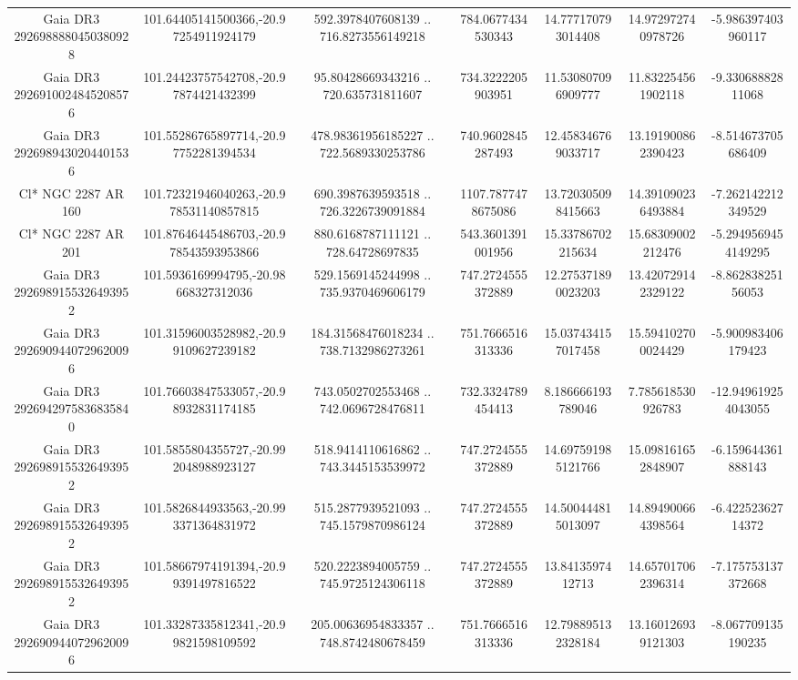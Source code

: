 \begin{table}
\begin{tabular}{ccccccc}
Gaia DR3 2926988880450380928 & 101.64405141500366,-20.97254911924179 & 592.3978407608139 .. 716.8273556149218 & 784.0677434530343 & 14.777170793014408 & 14.972972740978726 & -5.986397403960117 \\
Gaia DR3 2926910024845208576 & 101.24423757542708,-20.97874421432399 & 95.80428669343216 .. 720.635731811607 & 734.3222205903951 & 11.530807096909777 & 11.832254561902118 & -9.33068882811068 \\
Gaia DR3 2926989430204401536 & 101.55286765897714,-20.97752281394534 & 478.98361956185227 .. 722.5689330253786 & 740.9602845287493 & 12.458346769033717 & 13.191900862390423 & -8.514673705686409 \\
Cl* NGC 2287     AR     160 & 101.72321946040263,-20.978531140857815 & 690.3987639593518 .. 726.3226739091884 & 1107.7877478675086 & 13.720305098415663 & 14.391090236493884 & -7.262142212349529 \\
Cl* NGC 2287     AR     201 & 101.87646445486703,-20.978543593953866 & 880.6168787111121 .. 728.64728697835 & 543.3601391001956 & 15.33786702215634 & 15.68309002212476 & -5.2949569454149295 \\
Gaia DR3 2926989155326493952 & 101.5936169994795,-20.98668327312036 & 529.1569145244998 .. 735.9370469606179 & 747.2724555372889 & 12.275371890023203 & 13.420729142329122 & -8.86283825156053 \\
Gaia DR3 2926909440729620096 & 101.31596003528982,-20.99109627239182 & 184.31568476018234 .. 738.7132986273261 & 751.7666516313336 & 15.037434157017458 & 15.594102700024429 & -5.900983406179423 \\
Gaia DR3 2926942975836835840 & 101.76603847533057,-20.98932831174185 & 743.0502702553468 .. 742.0696728476811 & 732.3324789454413 & 8.186666193789046 & 7.785618530926783 & -12.949619254043055 \\
Gaia DR3 2926989155326493952 & 101.5855804355727,-20.992048988923127 & 518.9414110616862 .. 743.3445153539972 & 747.2724555372889 & 14.697591985121766 & 15.098161652848907 & -6.159644361888143 \\
Gaia DR3 2926989155326493952 & 101.5826844933563,-20.993371364831972 & 515.2877939521093 .. 745.1579870986124 & 747.2724555372889 & 14.500444815013097 & 14.894900664398564 & -6.42252362714372 \\
Gaia DR3 2926989155326493952 & 101.58667974191394,-20.99391497816522 & 520.2223894005759 .. 745.9725124306118 & 747.2724555372889 & 13.8413597412713 & 14.657017062396314 & -7.175753137372668 \\
Gaia DR3 2926909440729620096 & 101.33287335812341,-20.99821598109592 & 205.00636954833357 .. 748.8742480678459 & 751.7666516313336 & 12.798895132328184 & 13.160126939121303 & -8.067709135190235 \\

\end{tabular}
\end{table}
